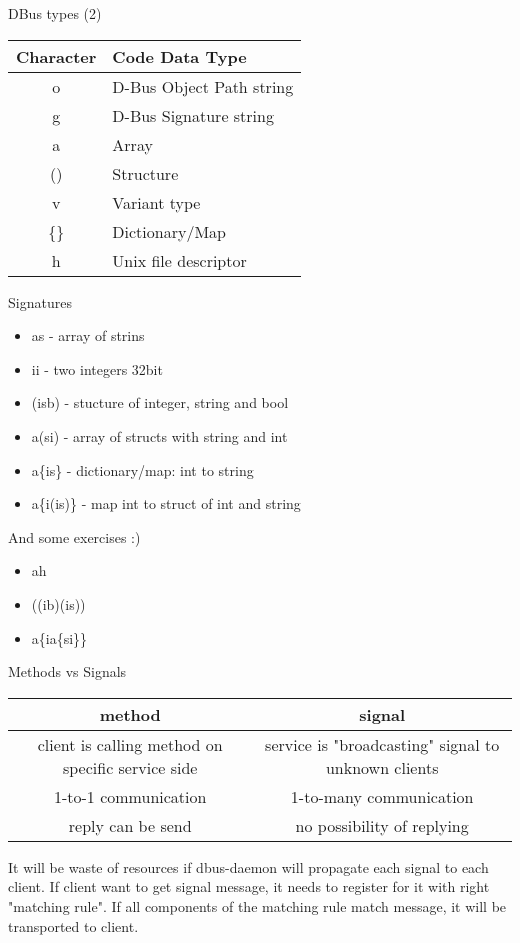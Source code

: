 \documentclass{beamer}
\begin{document}
\begin{frame}{DBus types (2)}
  \begin{center}
    \begin{normalsize}
      \begin{tabulary}{1.0\textwidth}{|C|L|}
\hline
Character & Code Data Type\\
\hline
\hline
o & D-Bus Object Path string\\
\hline
g & D-Bus Signature string\\
\hline
a & Array\\
\hline
() & Structure\\
\hline
v & Variant type\\
\hline
\{\} & Dictionary/Map\\
\hline
h &Unix file descriptor\\
\hline
      \end{tabulary}
    \end{normalsize}
  \end{center}
\end{frame}

\begin{frame}{Signatures}
  \begin{itemize}
    \item as - array of strins
    \item ii - two integers 32bit
    \item (isb) - stucture of integer, string and bool
    \item a(si) - array of structs with string and int
    \item a\{is\} - dictionary/map: int to string
    \item a\{i(is)\} - map int to struct of int and string
  \end{itemize}
  \vfill
  \pause
  \begin{exampleblock}{And some exercises :)}
    \begin{itemize}
      \item ah
      \item ((ib)(is))
      \item a\{ia\{si\}\}
    \end{itemize}
  \end{exampleblock}
\end{frame}

\begin{frame}{Methods vs Signals}
\begin{tabulary}{1.0\textwidth}{|C|C|}
\hline
method & signal\\
\hline
\hline
client is calling method on specific service side & service is "broadcasting" signal to unknown clients\\
-to-1 communication & 1-to-many communication\\
\hline
reply can be send & no possibility of replying\\
\hline
\end{tabulary}
\vfill
\pause
It will be waste of resources if dbus-daemon will propagate each signal to each client. If client want to get signal message, it needs to register for it with right "matching rule". If all components of the matching rule match message, it will be transported to client.
\end{frame}
\end{document}
